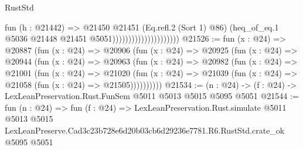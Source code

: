 \begin{lexlean}{RustStd}
\begin{coremodule}
                                          fun (h : @21442) =>
                                          @21450
                                            @21451
                                            (Eq.refl.{2} (Sort 1) @86)
                                            (heq_of_eq.{1}
                                              @5036
                                              @21448
                                              @21451
                                              @5051)))))))))))))))))))))
@21526 := fun (x : @24) =>
  @20887
    (fun (x : @24) =>
    @20906
      (fun (x : @24) =>
      @20925
        (fun (x : @24) =>
        @20944
          (fun (x : @24) =>
          @20963
            (fun (x : @24) =>
            @20982
              (fun (x : @24) =>
              @21001
                (fun (x : @24) =>
                @21020
                  (fun (x : @24) =>
                  @21039 (fun (x : @24) => @21058 (fun (x : @24) => @21505))))))))))
@21534 := (n : @24) -> (f : @24) -> LexLeanPreservation.Rust.FunSem @5011 @5013 @5015 @5095 @5051
@21544 := fun (n : @24) =>
  fun (f : @24) =>
  LexLeanPreservation.Rust.simulate
    @5011
    @5013
    @5015
    LexLeanPreserve.Cad3c23b728e6d20b03cb6d29236e7781.R6.RustStd.crate_ok
    @5095
    @5051
\end{coremodule}
\end{lexlean}
